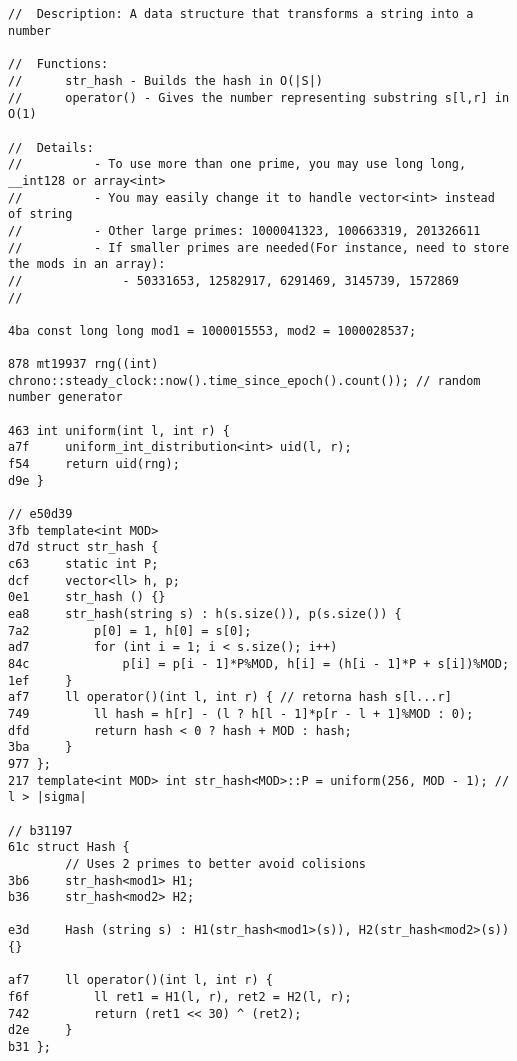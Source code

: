 \documentclass[11pt, a4paper, twoside]{article}
\begin{document}
\subsection{}
\begin{lstlisting}
//  Description: A data structure that transforms a string into a number

//  Functions:
//      str_hash - Builds the hash in O(|S|)
//      operator() - Gives the number representing substring s[l,r] in O(1)

//  Details:
//          - To use more than one prime, you may use long long, __int128 or array<int>
//          - You may easily change it to handle vector<int> instead of string
//          - Other large primes: 1000041323, 100663319, 201326611
//          - If smaller primes are needed(For instance, need to store the mods in an array):
//              - 50331653, 12582917, 6291469, 3145739, 1572869
//

4ba const long long mod1 = 1000015553, mod2 = 1000028537;

878 mt19937 rng((int) chrono::steady_clock::now().time_since_epoch().count()); // random number generator

463 int uniform(int l, int r) {
a7f     uniform_int_distribution<int> uid(l, r);
f54     return uid(rng);
d9e }

// e50d39
3fb template<int MOD> 
d7d struct str_hash {
c63     static int P;
dcf     vector<ll> h, p;
0e1     str_hash () {}
ea8     str_hash(string s) : h(s.size()), p(s.size()) {
7a2         p[0] = 1, h[0] = s[0];
ad7         for (int i = 1; i < s.size(); i++)
84c             p[i] = p[i - 1]*P%MOD, h[i] = (h[i - 1]*P + s[i])%MOD;
1ef     }
af7     ll operator()(int l, int r) { // retorna hash s[l...r]
749         ll hash = h[r] - (l ? h[l - 1]*p[r - l + 1]%MOD : 0);
dfd         return hash < 0 ? hash + MOD : hash;
3ba     }
977 };
217 template<int MOD> int str_hash<MOD>::P = uniform(256, MOD - 1); // l > |sigma|

// b31197
61c struct Hash {
        // Uses 2 primes to better avoid colisions
3b6     str_hash<mod1> H1;
b36     str_hash<mod2> H2;
     
e3d     Hash (string s) : H1(str_hash<mod1>(s)), H2(str_hash<mod2>(s)) {}
     
af7     ll operator()(int l, int r) {
f6f         ll ret1 = H1(l, r), ret2 = H2(l, r);
742         return (ret1 << 30) ^ (ret2);
d2e     }
b31 };
\end{lstlisting}
\end{document}
